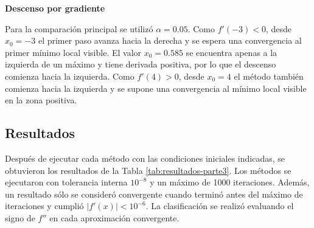 \documentclass[12pt]{article}
\begin{document}
\textbf{Descenso por gradiente}

Para la comparación principal se utilizó $\alpha=0.05$. Como $f'(-3)<0$, desde $x_0=-3$ el primer paso avanza hacia la derecha y se espera una convergencia al primer mínimo local visible. El valor $x_0=0.585$ se encuentra apenas a la izquierda de un máximo y tiene derivada positiva, por lo que el descenso comienza hacia la izquierda. Como $f'(4)>0$, desde $x_0=4$ el método también comienza hacia la izquierda y se supone una convergencia al mínimo local visible en la zona positiva.

\subsection{Resultados}

Después de ejecutar cada método con las condiciones iniciales indicadas, se obtuvieron los resultados de la Tabla \ref{tab:resultados-parte3}. Los métodos se ejecutaron con tolerancia interna $10^{-8}$ y un máximo de 1000 iteraciones. Además, un resultado sólo se consideró convergente cuando terminó antes del máximo de iteraciones y cumplió $|f'(x)|<10^{-6}$. La clasificación se realizó evaluando el signo de $f''$ en cada aproximación convergente.
\end{document}
